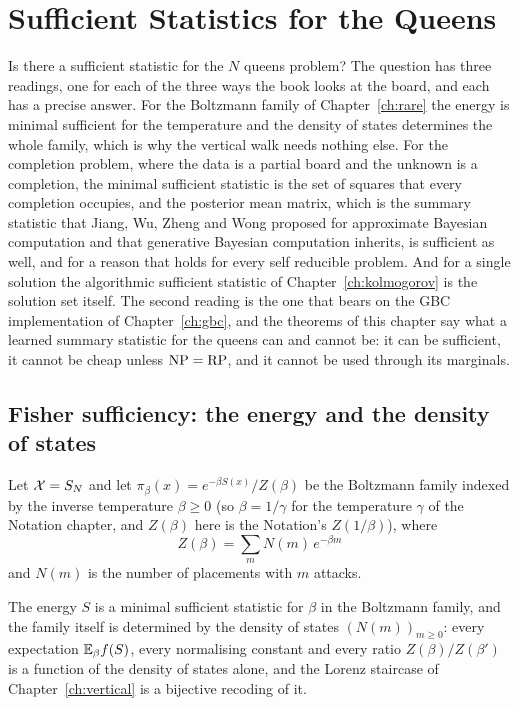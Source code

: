 \chapter{Sufficient Statistics for the Queens}
\label{ch:sufficient}

Is there a sufficient statistic for the $N$ queens problem? The question has three readings, one for each of the three ways the book looks at the board, and each has a precise answer. For the Boltzmann family of Chapter~\ref{ch:rare} the energy is minimal sufficient for the temperature and the density of states determines the whole family, which is why the vertical walk needs nothing else. For the completion problem, where the data is a partial board and the unknown is a completion, the minimal sufficient statistic is the set of squares that every completion occupies, and the posterior mean matrix, which is the summary statistic that Jiang, Wu, Zheng and Wong \cite{JiangWong2017} proposed for approximate Bayesian computation and that generative Bayesian computation inherits, is sufficient as well, and for a reason that holds for every self reducible problem. And for a single solution the algorithmic sufficient statistic of Chapter~\ref{ch:kolmogorov} is the solution set itself. The second reading is the one that bears on the GBC implementation of Chapter~\ref{ch:gbc}, and the theorems of this chapter say what a learned summary statistic for the queens can and cannot be: it can be sufficient, it cannot be cheap unless $\mathrm{NP} = \mathrm{RP}$, and it cannot be used through its marginals.

\section{Fisher sufficiency: the energy and the density of states}

Let $\mathcal{X} = S_N$ and let $\pi_\beta(x) = e^{-\beta S(x)} / Z(\beta)$ be the Boltzmann family indexed by the inverse temperature $\beta \ge 0$ (so $\beta = 1/\gamma$ for the temperature $\gamma$ of the Notation chapter, and $Z(\beta)$ here is the Notation's $Z(1/\beta)$), where
\[
Z(\beta) = \sum_m N(m) \, e^{-\beta m}
\]
and $N(m)$ is the number of placements with $m$ attacks.

\begin{theorem}
\label{thm:fisher}
The energy $S$ is a minimal sufficient statistic for $\beta$ in the Boltzmann family, and the family itself is determined by the density of states $(N(m))_{m \ge 0}$: every expectation $\mathbb{E}_\beta f(S)$, every normalising constant and every ratio $Z(\beta) / Z(\beta')$ is a function of the density of states alone, and the Lorenz staircase of Chapter~\ref{ch:vertical} is a bijective recoding of it.
\end{theorem}

